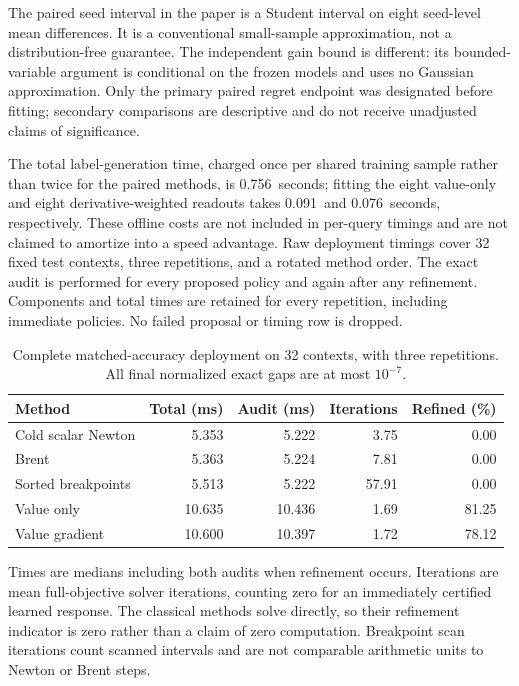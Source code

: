 \documentclass[11pt,letterpaper]{article}
\theoremstyle{definition}
\newcommand{\1}{\mathbf 1}
\newcommand{\RFourteenLabelTime}{0.756}
\newcommand{\RFourteenValueFit}{0.091}
\newcommand{\RFourteenGradientFit}{0.076}
\begin{document}
The paired seed interval in the paper is a Student interval on eight seed-level mean differences. It is a conventional small-sample approximation, not a distribution-free guarantee. The independent gain bound is different: its bounded-variable argument is conditional on the frozen models and uses no Gaussian approximation. Only the primary paired regret endpoint was designated before fitting; secondary comparisons are descriptive and do not receive unadjusted claims of significance.

The total label-generation time, charged once per shared training sample rather than twice for the paired methods, is \RFourteenLabelTime\ seconds; fitting the eight value-only and eight derivative-weighted readouts takes \RFourteenValueFit\ and \RFourteenGradientFit\ seconds, respectively. These offline costs are not included in per-query timings and are not claimed to amortize into a speed advantage. Raw deployment timings cover 32 fixed test contexts, three repetitions, and a rotated method order. The exact audit is performed for every proposed policy and again after any refinement. Components and total times are retained for every repetition, including immediate policies. No failed proposal or timing row is dropped.

\begin{table}[htbp]
\centering
\caption{Complete matched-accuracy deployment on 32 contexts, with three repetitions. All final normalized exact gaps are at most $10^{-7}$.}
\label{tab:r14-timing}
\begin{tabular}{lrrrr}
\toprule
Method & Total (ms) & Audit (ms) & Iterations & Refined (\%)\\
\midrule
Cold scalar Newton & 5.353 & 5.222 & 3.75 & 0.00\\
Brent & 5.363 & 5.224 & 7.81 & 0.00\\
Sorted breakpoints & 5.513 & 5.222 & 57.91 & 0.00\\
Value only & 10.635 & 10.436 & 1.69 & 81.25\\
Value gradient & 10.600 & 10.397 & 1.72 & 78.12\\
\bottomrule
\end{tabular}
\par\smallskip
\begin{minipage}{0.97\linewidth}
Times are medians including both audits when refinement occurs. Iterations are mean full-objective solver iterations, counting zero for an immediately certified learned response. The classical methods solve directly, so their refinement indicator is zero rather than a claim of zero computation. Breakpoint scan iterations count scanned intervals and are not comparable arithmetic units to Newton or Brent steps.
\end{minipage}
\end{table}
\end{document}
